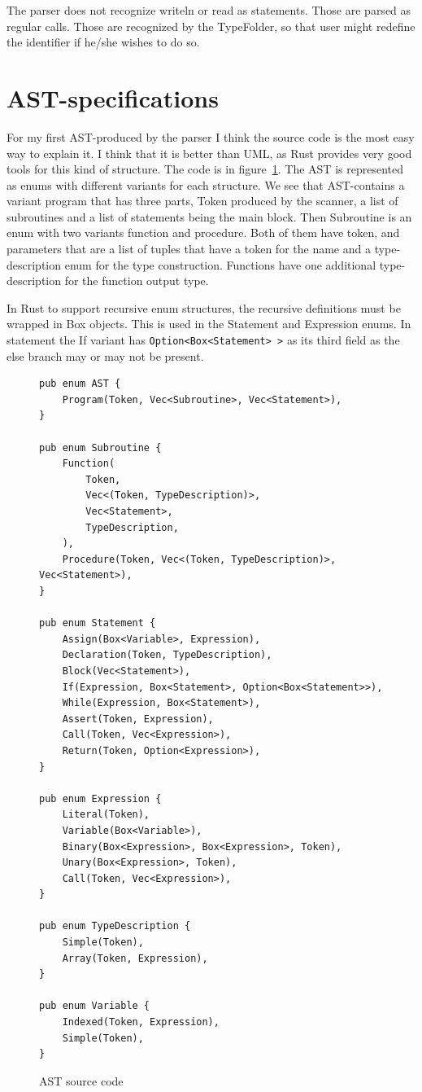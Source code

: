 \documentclass[12pt,a4paper]{article}
\begin{document}
The parser does not recognize writeln or read as statements.
Those are parsed as regular calls. Those are
recognized by the TypeFolder, so that user might redefine
the identifier if he/she wishes to do so.

\section{AST-specifications}

For my first AST-produced by the parser I think the source code is the most
easy way to explain it. I think that it is better than UML, as Rust provides
very good tools for this kind of structure. The code is in
figure~\ref{ast_source}.  The AST is represented as enums with different
variants for each structure. We see that AST-contains a variant program that
has three parts, Token produced by the scanner, a list of subroutines and a
list of statements being the main block. Then Subroutine is an enum with two
variants function and procedure. Both of them have token, and parameters that
are a list of tuples that have a token for the name and a type-description enum
for the type construction. Functions have one additional type-description for
the function output type.

In Rust to support recursive enum structures, the recursive definitions must
be wrapped in Box objects. This is used in the Statement and Expression enums.
In statement the If variant has \texttt{Option<Box<Statement> >} as its third field
as the else branch may or may not be present.

\begin{figure}
  \caption{AST source code}\label{ast_source}
\begin{lstlisting}
pub enum AST {
    Program(Token, Vec<Subroutine>, Vec<Statement>),
}

pub enum Subroutine {
    Function(
        Token,
        Vec<(Token, TypeDescription)>,
        Vec<Statement>,
        TypeDescription,
    ),
    Procedure(Token, Vec<(Token, TypeDescription)>, Vec<Statement>),
}

pub enum Statement {
    Assign(Box<Variable>, Expression),
    Declaration(Token, TypeDescription),
    Block(Vec<Statement>),
    If(Expression, Box<Statement>, Option<Box<Statement>>),
    While(Expression, Box<Statement>),
    Assert(Token, Expression),
    Call(Token, Vec<Expression>),
    Return(Token, Option<Expression>),
}

pub enum Expression {
    Literal(Token),
    Variable(Box<Variable>),
    Binary(Box<Expression>, Box<Expression>, Token),
    Unary(Box<Expression>, Token),
    Call(Token, Vec<Expression>),
}

pub enum TypeDescription {
    Simple(Token),
    Array(Token, Expression),
}

pub enum Variable {
    Indexed(Token, Expression),
    Simple(Token),
}
\end{lstlisting}
\end{figure}
\end{document}
